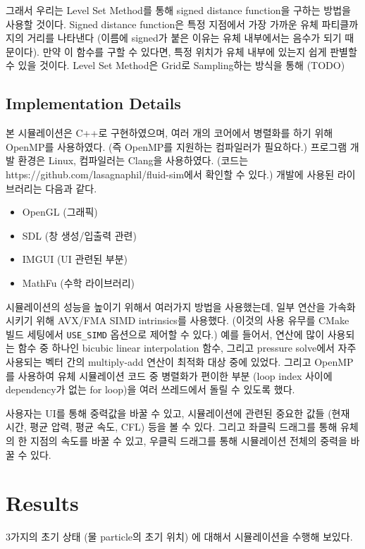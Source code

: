 \documentclass[10pt, A4]{article}
\begin{document}
그래서 우리는 Level Set Method를 통해 signed distance function을 구하는 방법을 사용할 것이다. Signed distance function은 특정 지점에서 가장 가까운 유체 파티클까지의 거리를 나타낸다 (이름에 signed가 붙은 이유는 유체 내부에서는 음수가 되기 때문이다). 만약 이 함수를 구할 수 있다면, 특정 위치가 유체 내부에 있는지 쉽게 판별할 수 있을 것이다. Level Set Method은 Grid로 Sampling하는 방식을 통해 (TODO)

\subsection{Implementation Details}

본 시뮬레이션은 C++로 구현하였으며, 여러 개의 코어에서 병렬화를 하기 위해 OpenMP를 사용하였다. (즉 OpenMP를 지원하는 컴파일러가 필요하다.) 프로그램 개발 환경은 Linux, 컴파일러는 Clang을 사용하였다. (코드는 https://github.com/lasagnaphil/fluid-sim에서 확인할 수 있다.) 개발에 사용된 라이브러리는 다음과 같다.

\begin{itemize}
  \item OpenGL (그래픽)
  \item SDL (창 생성/입출력 관련)
  \item IMGUI (UI 관련된 부분)
  \item MathFu (수학 라이브러리)
\end{itemize}

시뮬레이션의 성능을 높이기 위해서 여러가지 방법을 사용했는데, 일부 연산을 가속화시키기 위해 AVX/FMA SIMD intrinsics를 사용했다. (이것의 사용 유무를 CMake 빌드 세팅에서 \texttt{USE\_SIMD} 옵션으로 제어할 수 있다.) 예를 들어서, 연산에 많이 사용되는 함수 중 하나인 bicubic linear interpolation 함수, 그리고 pressure solve에서 자주 사용되는 벡터 간의 multiply-add 연산이 최적화 대상 중에 있었다.  그리고 OpenMP를 사용하여 유체 시뮬레이션 코드 중 병렬화가 편이한 부분 (loop index 사이에 dependency가 없는 for loop)을 여러 쓰레드에서 돌릴 수 있도록 했다.

사용자는 UI를 통해 중력값을 바꿀 수 있고, 시뮬레이션에 관련된 중요한 값들 (현재 시간, 평균 압력, 평균 속도, CFL) 등을 볼 수 있다. 그리고 좌클릭 드래그를 통해 유체의 한 지점의 속도를 바꿀 수 있고, 우클릭 드래그를 통해 시뮬레이션 전체의 중력을 바꿀 수 있다.

\section{Results}

3가지의 초기 상태 (물 particle의 초기 위치) 에 대해서 시뮬레이션을 수행해 보있다.
\end{document}
